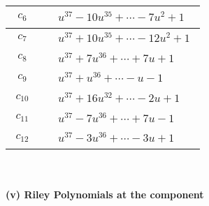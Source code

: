 \documentclass[1p]{elsarticle_modified}
\theoremstyle{definition}
\begin{document}
\begin{tabular}{m{50pt}|m{274pt}}
\hline $$\begin{aligned}c_{6}\end{aligned}$$&$\begin{aligned}
&u^{37}-10 u^{35}+\cdots-7 u^2+1
\end{aligned}$\\
\hline $$\begin{aligned}c_{7}\end{aligned}$$&$\begin{aligned}
&u^{37}+10 u^{35}+\cdots-12 u^2+1
\end{aligned}$\\
\hline $$\begin{aligned}c_{8}\end{aligned}$$&$\begin{aligned}
&u^{37}+7 u^{36}+\cdots+7 u+1
\end{aligned}$\\
\hline $$\begin{aligned}c_{9}\end{aligned}$$&$\begin{aligned}
&u^{37}+u^{36}+\cdots- u-1
\end{aligned}$\\
\hline $$\begin{aligned}c_{10}\end{aligned}$$&$\begin{aligned}
&u^{37}+16 u^{32}+\cdots-2 u+1
\end{aligned}$\\
\hline $$\begin{aligned}c_{11}\end{aligned}$$&$\begin{aligned}
&u^{37}-7 u^{36}+\cdots+7 u-1
\end{aligned}$\\
\hline $$\begin{aligned}c_{12}\end{aligned}$$&$\begin{aligned}
&u^{37}-3 u^{36}+\cdots-3 u+1
\end{aligned}$\\
\hline
\end{tabular}\\~\\
\newpage\renewcommand{\arraystretch}{1}
\flushleft \textbf{(v) Riley Polynomials at the component}\newline \\
\end{document}
